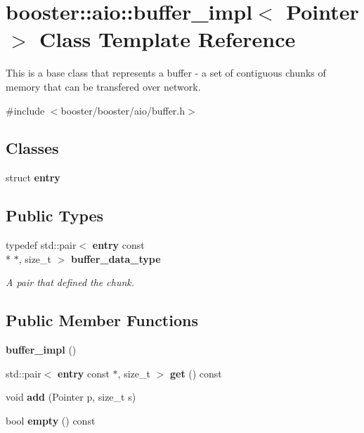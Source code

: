 \section{booster\-:\-:aio\-:\-:buffer\-\_\-impl$<$ Pointer $>$ Class Template Reference}
\label{classbooster_1_1aio_1_1buffer__impl}


This is a base class that represents a buffer -\/ a set of contiguous chunks of memory that can be transfered over network.  




{\ttfamily \#include $<$booster/booster/aio/buffer.\-h$>$}

\subsection*{Classes}
\begin{DoxyCompactItemize}
\item 
struct {\bf entry}
\end{DoxyCompactItemize}
\subsection*{Public Types}
\begin{DoxyCompactItemize}
\item 
typedef std\-::pair$<$ {\bf entry} const \\*
$\ast$, size\-\_\-t $>$ {\bf buffer\-\_\-data\-\_\-type}\label{classbooster_1_1aio_1_1buffer__impl_af62874c2d9d31b2b3de2a1a8ad1021f1}

\begin{DoxyCompactList}\small\item\em A pair that defined the chunk. \end{DoxyCompactList}\end{DoxyCompactItemize}
\subsection*{Public Member Functions}
\begin{DoxyCompactItemize}
\item 
{\bf buffer\-\_\-impl} ()
\item 
std\-::pair$<$ {\bf entry} const $\ast$, size\-\_\-t $>$ {\bf get} () const 
\item 
void {\bf add} (Pointer p, size\-\_\-t s)
\item 
bool {\bf empty} () const 
\end{DoxyCompactItemize}


